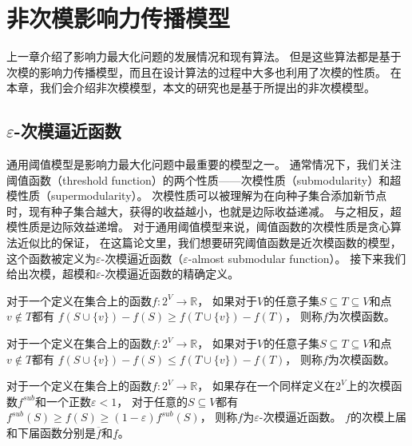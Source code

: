 
\chapter{非次模影响力传播模型}
上一章介绍了影响力最大化问题的发展情况和现有算法。
但是这些算法都是基于次模的影响力传播模型，而且在设计算法的过程中大多也利用了次模的性质。
在本章，我们会介绍非次模模型，本文的研究也是基于所提出的非次模模型。

\section{$\varepsilon$-次模逼近函数}
通用阈值模型是影响力最大化问题中最重要的模型之一。
通常情况下，我们关注阈值函数（threshold function）的两个性质——次模性质（submodularity）和超模性质（supermodularity）。
次模性质可以被理解为在向种子集合添加新节点时，现有种子集合越大，获得的收益越小，也就是边际收益递减。
与之相反，超模性质是边际效益递增。
对于通用阈值模型来说，阈值函数的次模性质是贪心算法近似比的保证\cite{Mossel2007sub}，
在这篇论文里，我们想要研究阈值函数是近次模函数的模型，这个函数被定义为$\varepsilon$-次模逼近函数（$\varepsilon$-almost submodular function）。
接下来我们给出次模，超模和$\varepsilon$-次模逼近函数的精确定义。

\begin{definition}[次模 (Submodular)]
对于一个定义在集合上的函数$f:2^V \to \mathbb{R}$，
如果对于$V$的任意子集$S \subseteq T \subseteq V$和点$v \not\in T$都有
$f(S \cup \{v\}) - f(S) \geq f(T \cup \{v\}) - f(T)$，
则称$f$为次模函数。
\end{definition}

\begin{definition}[超模 (Supermodular)]
对于一个定义在集合上的函数$f:2^V \to \mathbb{R}$，
如果对于$V$的任意子集$S \subseteq T \subseteq V$和点$v \not\in T$都有
$f(S \cup \{v\}) - f(S) \leq f(T \cup \{v\}) - f(T)$，
则称$f$为次模函数。
\end{definition}

\begin{definition}
对于一个定义在集合上的函数$f:2^V \to \mathbb{R}$，
如果存在一个同样定义在$2^V$上的次模函数$f^{sub}$和一个正数$\varepsilon<1$，
对于任意的$S \subseteq V$都有$f^{sub}(S) \geq f(S) \geq (1-\varepsilon)f^{sub}(S)$，
则称$f$为$\varepsilon$-次模逼近函数。
$f$的次模上届和下届函数分别是$\overline{f}$和$\underline{f}$。
\end{definition}

